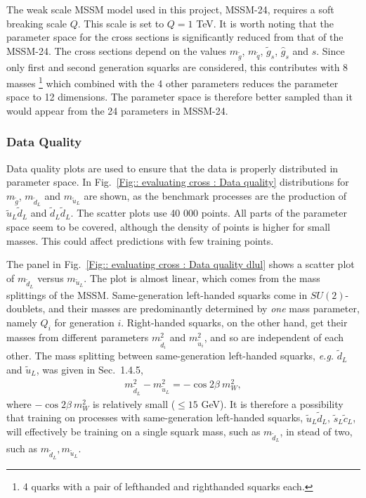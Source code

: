 \documentclass[twoside,english]{uiofysmaster}
\begin{document}
The weak scale MSSM model used in this project, MSSM-24, requires a soft breaking scale $Q$. This scale is set to $Q=1$ TeV. It is worth noting that the parameter space for the cross sections is significantly reduced from that of the MSSM-24. The cross sections depend on the values $m_{\tilde{g}}$, $m_{\tilde{q}}$, $\tilde{g}_s$, $\hat{g}_s$ and $s$. Since only first and second generation squarks are considered, this contributes with 8 masses \footnote{4 quarks with a pair of lefthanded and righthanded squarks each.} which combined with the 4 other parameters reduces the parameter space to 12 dimensions. The parameter space is therefore better sampled than it would appear from the 24 parameters in MSSM-24.

\subsubsection{Data Quality}\label{Sec:: results : Data Quality}


Data quality plots are used to ensure that the data is properly distributed in parameter space. In Fig.~\ref{Fig:: evaluating cross : Data quality} distributions for $m_{\tilde{g}}$, $m_{\tilde{d}_L}$ and $m_{\tilde{u}_L}$ are shown, as the benchmark processes are the production of $\tilde{u}_L \tilde{d}_L$ and $\tilde{d}_L \tilde{d}_L$. The scatter plots use 40 000 points. All parts of the parameter space seem to be covered, although the density of points is higher for small masses. This could affect predictions with few training points.

The panel in Fig.~\ref{Fig:: evaluating cross : Data quality dlul} shows a scatter plot of $m_{\tilde{d}_L}$ versus $m_{\tilde{u}_L}$. The plot is almost linear, which comes from the mass splittings of the MSSM. Same-generation left-handed squarks come in $SU(2)$-doublets, and their masses are predominantly determined by \textit{one} mass parameter, namely $Q_i$ for generation $i$. Right-handed squarks, on the other hand, get their masses from different parameters $m_{\tilde{d}_i}^2$ and $m_{\tilde{u}_i}^2$, and so are independent of each other. The mass splitting between same-generation left-handed squarks, \textit{e.g.} $\tilde{d}_L$ and $\tilde{u}_L$, was given in Sec.~1.4.5,
\begin{align*}
m_{\tilde{d}_L}^2 - m_{\tilde{u}_L}^2 = - \cos 2 \beta ~m_W^2,
\end{align*}
where $- \cos 2 \beta~m_W^2$ is relatively small ($\leq 15$ GeV). It is therefore a possibility that training on processes with same-generation left-handed squarks, $\tilde{u}_L \tilde{d}_L$, $\tilde{s}_L \tilde{c}_L$, will effectively be training on a single squark mass, such as $m_{\tilde{d}_L}$, in stead of two, such as $m_{\tilde{d}_L}, m_{\tilde{u}_L}$. 
\end{document}
